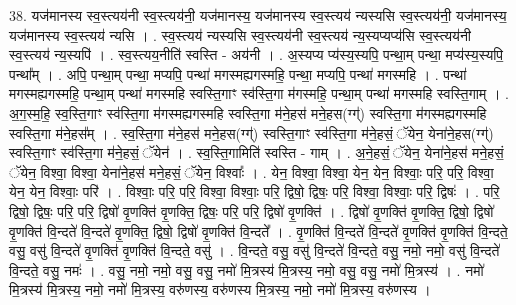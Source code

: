 \documentclass[17pt]{extarticle}
\begin{document}
38. यज॑मानस्य स्व॒स्त्यय॑नी स्व॒स्त्यय॑नी॒ यज॑मानस्य॒ यज॑मानस्य स्व॒स्त्यय॑ न्यस्यसि स्व॒स्त्यय॑नी॒ यज॑मानस्य॒ यज॑मानस्य स्व॒स्त्यय॑ न्यसि । . स्व॒स्त्यय॑ न्यस्यसि स्व॒स्त्यय॑नी स्व॒स्त्यय॑ न्य॒स्यप्यप्य॑सि स्व॒स्त्यय॑नी स्व॒स्त्यय॑ न्य॒स्यपि॑ । . स्व॒स्त्यय॒नीति॑ स्वस्ति - अय॑नी । . अ॒स्यप्य प्य॑स्य॒स्यपि॒ पन्था॒म् पन्था॒ मप्य॑स्य॒स्यपि॒ पन्था᳚म् । . अपि॒ पन्था॒म् पन्था॒ मप्यपि॒ पन्था॑ मगस्मह्यगस्महि॒ पन्था॒ मप्यपि॒ पन्था॑ मगस्महि । . पन्था॑ मगस्मह्यगस्महि॒ पन्था॒म् पन्था॑ मगस्महि स्वस्ति॒गाꣳ स्व॑स्ति॒गा म॑गस्महि॒ पन्था॒म् पन्था॑ मगस्महि स्वस्ति॒गाम् । . अ॒ग॒स्म॒हि॒ स्व॒स्ति॒गाꣳ स्व॑स्ति॒गा म॑गस्मह्यगस्महि स्वस्ति॒गा म॑ने॒हस॑ मने॒हस(ग्ग्॑) स्वस्ति॒गा म॑गस्मह्यगस्महि स्वस्ति॒गा म॑ने॒हस᳚म् । . स्व॒स्ति॒गा म॑ने॒हस॑ मने॒हस(ग्ग्॑) स्वस्ति॒गाꣳ स्व॑स्ति॒गा म॑ने॒हसं॒ ॅयेन॒ येना॑ने॒हस(ग्ग्॑) स्वस्ति॒गाꣳ स्व॑स्ति॒गा म॑ने॒हसं॒ ॅयेन॑ । . स्व॒स्ति॒गामिति॑ स्वस्ति - गाम् । . अ॒ने॒हसं॒ ॅयेन॒ येना॑ने॒हस॑ मने॒हसं॒ ॅयेन॒ विश्वा॒ विश्वा॒ येना॑ने॒हस॑ मने॒हसं॒ ॅयेन॒ विश्वाः᳚ । . येन॒ विश्वा॒ विश्वा॒ येन॒ येन॒ विश्वाः॒ परि॒ परि॒ विश्वा॒ येन॒ येन॒ विश्वाः॒ परि॑ । . विश्वाः॒ परि॒ परि॒ विश्वा॒ विश्वाः॒ परि॒ द्विषो॒ द्विषः॒ परि॒ विश्वा॒ विश्वाः॒ परि॒ द्विषः॑ । . परि॒ द्विषो॒ द्विषः॒ परि॒ परि॒ द्विषो॑ वृ॒णक्ति॑ वृ॒णक्ति॒ द्विषः॒ परि॒ परि॒ द्विषो॑ वृ॒णक्ति॑ । . द्विषो॑ वृ॒णक्ति॑ वृ॒णक्ति॒ द्विषो॒ द्विषो॑ वृ॒णक्ति॑ वि॒न्दते॑ वि॒न्दते॑ वृ॒णक्ति॒ द्विषो॒ द्विषो॑ वृ॒णक्ति॑ वि॒न्दते᳚ । . वृ॒णक्ति॑ वि॒न्दते॑ वि॒न्दते॑ वृ॒णक्ति॑ वृ॒णक्ति॑ वि॒न्दते॒ वसु॒ वसु॑ वि॒न्दते॑ वृ॒णक्ति॑ वृ॒णक्ति॑ वि॒न्दते॒ वसु॑ । . वि॒न्दते॒ वसु॒ वसु॑ वि॒न्दते॑ वि॒न्दते॒ वसु॒ नमो॒ नमो॒ वसु॑ वि॒न्दते॑ वि॒न्दते॒ वसु॒ नमः॑ । . वसु॒ नमो॒ नमो॒ वसु॒ वसु॒ नमो॑ मि॒त्रस्य॑ मि॒त्रस्य॒ नमो॒ वसु॒ वसु॒ नमो॑ मि॒त्रस्य॑ । . नमो॑ मि॒त्रस्य॑ मि॒त्रस्य॒ नमो॒ नमो॑ मि॒त्रस्य॒ वरु॑णस्य॒ वरु॑णस्य मि॒त्रस्य॒ नमो॒ नमो॑ मि॒त्रस्य॒ वरु॑णस्य । \newline
\end{document}

